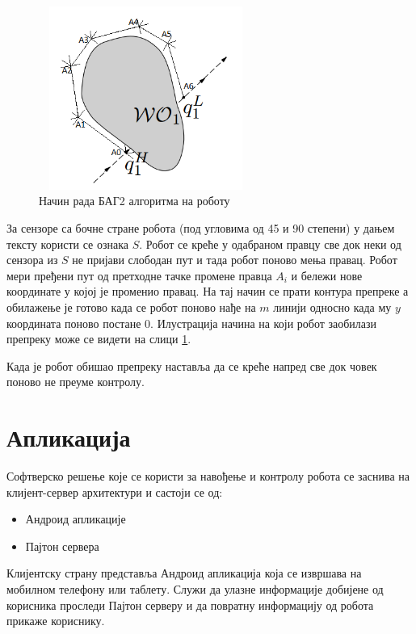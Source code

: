 \documentclass[12pt,oneside]{memoir}
\theoremstyle{remark}
\begin{document}
\begin{figure}[!ht]
\centering
\includegraphics[width=7cm, height=6cm]{slike/adapt_bug.png}
\caption{Начин рада БАГ2 алгоритма на роботу}
\label{fig:bugadapt}
\end{figure}

За сензоре са бочне стране робота (под угловима од 45 и 90 степени) у дањем тексту користи се ознака $S$. Робот се креће у одабраном правцу све док неки од сензора из $S$ не пријави слободан пут и тада робот поново мења правац. Робот мери пређени пут од претходне тачке промене правца $A_{i}$ и бележи нове координате у којој је променио правац. На тај начин се прати контура препреке а обилажење је готово када се робот поново нађе на $m$ линији односно када му $y$ координата поново постане 0. Илустрација начина на који робот заобилази препреку може се видети на слици  \ref{fig:bugadapt}.

Када је робот обишао препреку наставља да се креће напред све док човек поново не преуме контролу.


\chapter{Апликација}
\label{chp:aplikacija}
Софтверско решење које се користи за навођење и контролу робота се заснива на клијент-сервер архитектури и састоји се од:
\begin{itemize}
\item Андроид апликације
\item Пајтон сервера
\end{itemize}

Клијентску страну представља Андроид апликација која се извршава на мобилном телефону или таблету. Служи да улазне информације добијене од корисника проследи Пајтон серверу и да повратну информацију од робота прикаже кориснику.
\end{document}
